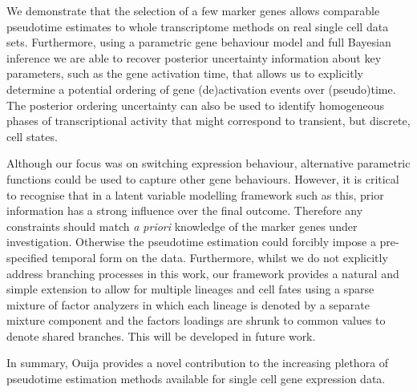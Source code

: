 We demonstrate that the selection of a few marker genes allows comparable pseudotime estimates to whole transcriptome methods on real single cell data sets. Furthermore, using a parametric gene behaviour model and full Bayesian inference we are able to recover posterior uncertainty information about key parameters, such as the gene activation time, that allows us to explicitly determine a potential ordering of gene (de)activation events over (pseudo)time. The posterior ordering uncertainty can also be used to identify homogeneous phases of transcriptional activity that might correspond to transient, but discrete, cell states.

Although our focus was on switching expression behaviour, alternative parametric functions could be used to capture other gene behaviours. However, it is critical to recognise that in a latent variable modelling framework such as this, prior information has a strong influence over the final outcome. Therefore any constraints should match \emph{a priori} knowledge of the marker genes under investigation. Otherwise the pseudotime estimation could forcibly impose a pre-specified temporal form on the data. Furthermore, whilst we do not explicitly address branching processes in this work, our framework provides a natural and simple extension to allow for multiple lineages and cell fates using a sparse mixture of factor analyzers in which each lineage is denoted by a separate mixture component and the factors loadings are shrunk to common values to denote shared branches. This will be developed in future work.

In summary, Ouija provides a novel contribution to the increasing plethora of pseudotime estimation methods available for single cell gene expression data.
